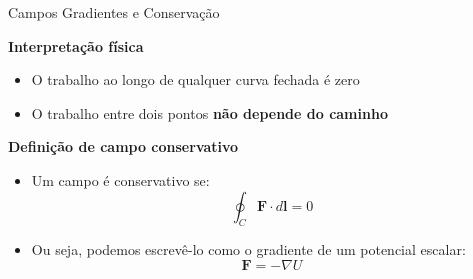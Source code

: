\documentclass[aspectratio=169]{beamer}
\begin{document}
\begin{frame}{Campos Gradientes e Conservação}

\textbf{Interpretação física }
\begin{itemize}
    \item O trabalho ao longo de qualquer curva fechada é zero
    \item O trabalho entre dois pontos \textbf{não depende do caminho}
\end{itemize}

\vspace{0.4cm}

\textbf{Definição de campo conservativo}
\begin{itemize}
    \item Um campo é conservativo se:
    \begin{equation}
    \label{eq:conservativo}
    \oint_C \mathbf{F}\cdot d\mathbf{l} = 0
    \end{equation}
    \item Ou seja, podemos escrevê-lo como o gradiente de um potencial escalar:
    \begin{equation}
    \label{eq:potencial}
    \mathbf{F} = -\nabla U
    \end{equation}
\end{itemize}

\vspace{0.4cm}
\end{frame}
\end{document}
